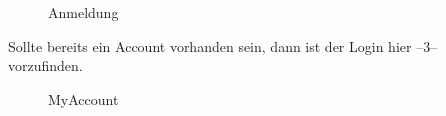 \documentclass[11pt,ngerman]{article}
\begin{document}
    \begin{figure}[H]
    	\centering
    	\caption{Anmeldung}
    	\label{fig:Anmeldung}
    \end{figure}
    
    Sollte bereits ein Account vorhanden sein, dann ist der Login hier --3-- vorzufinden.
       
    \begin{figure}[H]
    	\centering
    	\caption{MyAccount}
    	\label{fig:MyAccount}
    \end{figure}
\end{document}
